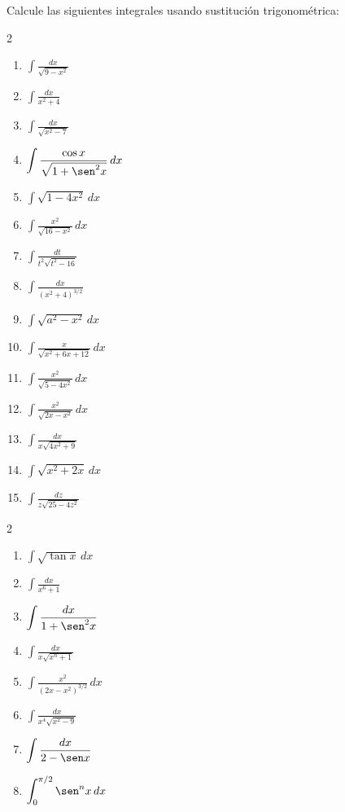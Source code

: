 \begin{prob}
Calcule las siguientes integrales usando sustitución trigonométrica:
\begin{multicols}{2}
\begin{enumerate}
\item $\displaystyle\int\frac{dx}{\sqrt{9-x^2}}$
\item $\displaystyle\int\frac{dx}{x^2+4}$
\item $\displaystyle\int\frac{dx}{\sqrt{x^2-7}}$
\item $\displaystyle\int\frac{\cos x}{\sqrt{1+\sen^2 x}}\,dx$
\item $\displaystyle\int\sqrt{1-4x^2}\,dx$
\item $\displaystyle\int\frac{x^2}{\sqrt{16-x^2}}\,dx$
\item $\displaystyle\int\frac{dt}{t^2\sqrt{t^2-16}}$
\item $\displaystyle\int\frac{dx}{(x^2+4)^{3/2}}$
\item $\displaystyle\int\sqrt{a^2-x^2}\,dx$
\item $\displaystyle\int\frac{x}{\sqrt{x^2+6x+12}}\,dx$
\item $\displaystyle\int\frac{x^2}{\sqrt{5-4x^2}}\,dx$
\item $\displaystyle\int\frac{x^2}{\sqrt{2x-x^2}}\,dx$
\item $\displaystyle\int\frac{dx}{x\sqrt{4x^2+9}}$
\item $\displaystyle\int\sqrt{x^2+2x}\,dx$
\item $\displaystyle\int\frac{dz}{z\sqrt{25-4z^2}}$
\end{enumerate}
\end{multicols}
\end{prob}

\begin{prob}
\begin{multicols}{2}
\begin{enumerate}
\item $\displaystyle\int\sqrt{\tan x}\,dx$
\item $\displaystyle\int\frac{dx}{x^6+1}$
\item $\displaystyle\int\frac{dx}{1+\sen^2 x}$
\item $\displaystyle\int\frac{dx}{x\sqrt{x^n+1}}$
\item $\displaystyle\int\frac{x^2}{(2x-x^2)^{3/2}}\,dx$
\item $\displaystyle\int\frac{dx}{x^4\sqrt{x^2-9}}$
\item $\displaystyle\int\frac{dx}{2-\sen x}$
\item $\displaystyle\int_0^{\pi/2}\sen^n x\,dx$
\end{enumerate}
\end{multicols}
\end{prob}

